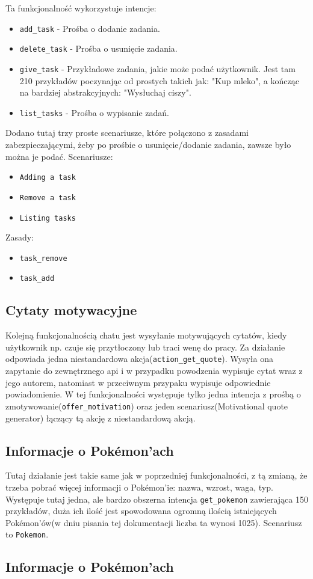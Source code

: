 \documentclass{article}
\begin{document}
Ta funkcjonalność wykorzystuje intencje:
\begin{itemize}
    \item \verb|add_task| - Prośba o dodanie zadania.
    \item \verb|delete_task| - Prośba o usunięcie zadania.
    \item \verb|give_task| - Przykładowe zadania, jakie może podać użytkownik.
        Jest tam 210 przykładów poczynając od prostych takich jak: "Kup mleko",
        a kończąc na bardziej abstrakcyjnych: "Wysłuchaj ciszy".
    \item \verb|list_tasks| - Prośba o wypisanie zadań.
\end{itemize}
Dodano tutaj trzy proste scenariusze, które połączono z zasadami
zabezpieczającymi, żeby po prośbie o usunięcie/dodanie zadania, zawsze było
można je podać.
Scenariusze:
\begin{itemize}
    \item \verb|Adding a task|
    \item \verb|Remove a task|
    \item \verb|Listing tasks| 
\end{itemize}
Zasady:
\begin{itemize}
    \item \verb|task_remove|
    \item \verb|task_add|
\end{itemize}


\subsection{Cytaty motywacyjne}
Kolejną funkcjonalnością chatu jest wysyłanie motywujących cytatów, kiedy
użytkownik np. czuje się przytłoczony lub traci wenę do pracy. Za działanie
odpowiada jedna niestandardowa akcja(\verb|action_get_quote|). Wysyła ona
zapytanie do zewnętrznego api i w przypadku powodzenia wypisuje cytat wraz z
jego autorem, natomiast w przeciwnym przypaku wypisuje odpowiednie
powiadomienie. W tej funkcjonalności występuje tylko jedna intencja z prośbą o
zmotywowanie(\verb|offer_motivation|) oraz jeden scenariusz(Motivational quote
generator) łączący tą akcję z niestandardową akcją.


\subsection{Informacje o Pokémon'ach}
Tutaj działanie jest takie same jak w poprzedniej funkcjonalności, z tą
zmianą, że trzeba pobrać więcej informacji o Pokémon'ie:
nazwa, wzrost, waga, typ. Występuje tutaj jedna, ale bardzo obszerna intencja 
\verb|get_pokemon| zawierająca 150 przykładów, duża ich ilość jest spowodowana
ogromną ilością istniejących Pokémon'ów(w dniu pisania tej dokumentacji liczba
ta wynosi 1025). Scenariusz to \verb|Pokemon|.


\subsection{Informacje o Pokémon'ach}



















\listoffigures
\end{document}
